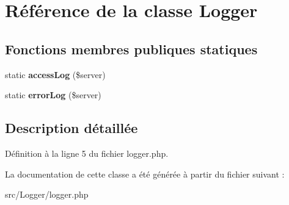 \hypertarget{class_logger_1_1_logger}{}\section{Référence de la classe Logger}
\label{class_logger_1_1_logger}
\subsection*{Fonctions membres publiques statiques}
\begin{DoxyCompactItemize}
\item 
static {\bfseries access\+Log} (\$server)\hypertarget{class_logger_1_1_logger_a59e043bc52a7b2b9f90a2a30f8003ae0}{}\label{class_logger_1_1_logger_a59e043bc52a7b2b9f90a2a30f8003ae0}

\item 
static {\bfseries error\+Log} (\$server)\hypertarget{class_logger_1_1_logger_a629b6bb27878aef34812cbf344e2707d}{}\label{class_logger_1_1_logger_a629b6bb27878aef34812cbf344e2707d}

\end{DoxyCompactItemize}


\subsection{Description détaillée}


Définition à la ligne 5 du fichier logger.\+php.



La documentation de cette classe a été générée à partir du fichier suivant \+:\begin{DoxyCompactItemize}
\item 
src/\+Logger/logger.\+php\end{DoxyCompactItemize}
